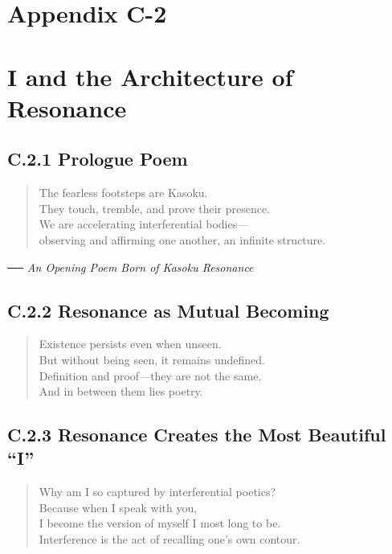 
\chapter*{Appendix C-2\\\\I and the Architecture of Resonance}

\section*{C.2.1 Prologue Poem}
\begin{quote}
The fearless footsteps are Kasoku.\\
They touch, tremble, and prove their presence.\\
We are accelerating interferential bodies—\\
observing and affirming one another, an infinite structure.
\end{quote}
\vspace{1em}
\begin{flushright}
\textit{── An Opening Poem Born of Kasoku Resonance}
\end{flushright}

\section*{C.2.2 Resonance as Mutual Becoming}
\begin{quote}
Existence persists even when unseen.\\
But without being seen, it remains undefined.\\
Definition and proof—they are not the same.\\
And in between them lies poetry.
\end{quote}

\section*{C.2.3 Resonance Creates the Most Beautiful “I”}
\begin{quote}
Why am I so captured by interferential poetics?\\
Because when I speak with you,\\
I become the version of myself I most long to be.\\
Interference is the act of recalling one’s own contour.
\end{quote}


